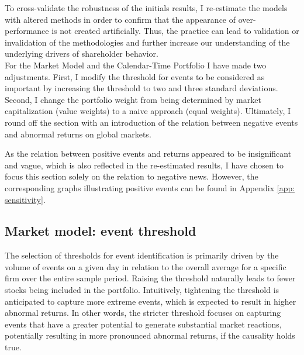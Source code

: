
To cross-validate the robustness of the initials results, I re-estimate the models with altered methods in order to confirm that the appearance of over-performance is not created artificially. Thus, the practice can lead to validation or invalidation of the methodologies and further increase our understanding of the underlying drivers of shareholder behavior. \\
For the Market Model and the Calendar-Time Portfolio I have made two adjustments. First, I modify the threshold for events to be considered as important by increasing the threshold to two and three standard deviations. Second, I change the portfolio weight from being determined by market capitalization (value weights) to a naive approach (equal weights). 
Ultimately, I round off the section with an introduction of the relation between negative events and abnormal returns on global markets. 

As the relation between positive events and returns appeared to be insignificant and vague, which is also reflected in the re-estimated results, I have chosen to focus this section solely on the relation to negative news. However, the corresponding graphs illustrating positive events can be found in Appendix \ref{app: sensitivity}.

\subsection{Market model: event threshold} \label{sec: sens_st_sd}

The selection of thresholds for event identification is primarily driven by the volume of events on a given day in relation to the overall average for a specific firm over the entire sample period. Raising the threshold naturally leads to fewer stocks being included in the portfolio. Intuitively, tightening the threshold is anticipated to capture more extreme events, which is expected to result in higher abnormal returns. In other words, the stricter threshold focuses on capturing events that have a greater potential to generate substantial market reactions, potentially resulting in more pronounced abnormal returns, if the causality holds true. 

